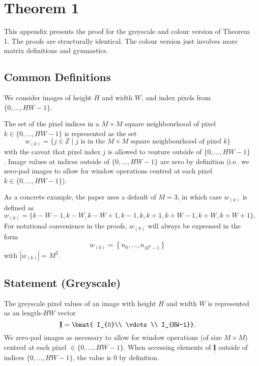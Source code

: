\documentclass{article}
\def\vt#1{\underline{\mathbf{#1}}}
\def\mt#1{\underline{\underline{\mathbf{#1}}}}
\begin{document}
\section{Theorem 1}
This appendix presents the proof for the greyscale and colour version of Theorem 1. The proofs are structurally identical. The colour version just involves more matrix definitions and gymnastics.

\subsection{Common Definitions}
We consider images of height $H$ and width $W$, and index pixels from $\{0,\dots,HW-1\}$.

The set of the pixel indices in a $M\times M$ square neighbourhood of pixel $k\in\{0,\dots,HW-1\}$ is represented as the set
$$w_{(k)} = \{j \in \mathbb{Z} \mid j\text{ is in the $M\times M$ square neighbourhood of pixel }k\}$$
with the caveat that pixel index $j$ is allowed to venture outside of $\{0,\dots, HW-1\}$. Image values at indices outside of $\{0,\dots,HW-1\}$ are zero by definition (i.e.\ we zero-pad images to allow for window operations centred at each pixel $k\in\{0,\dots, HW-1\}$).

As a concrete example, the paper uses a default of $M=3$, in which case $w_{(k)}$ is defined as
$$ w_{(k)} = \{k-W-1, k-W, k-W+1, k-1, k, k+1, k+W-1, k+W, k+W+1\}.$$
For notational convenience in the proofs, $w_{(k)}$ will always be expressed in the form
$$w_{(k)} = \left\{n_0, \dots, n_{M^2-1} \right\}$$
with $\left|w_{(k)}\right|=M^2$.

\subsection{Statement (Greyscale)}
The greyscale pixel values of an image with height $H$ and width $W$ is represented as an length-$HW$ vector
$$\vt I = \bmat{
    I_{0}\\
    \vdots\\
    I_{HW-1}}.$$
We zero-pad images as necessary to allow for window operations (of size $M\times M$) centred at each pixel $\in\{0,\dots,HW-1\}$. When accessing elements of $\mt I$ outside of indices $\{0, \dots, HW-1\}$, the value is 0 by definition.
\end{document}
